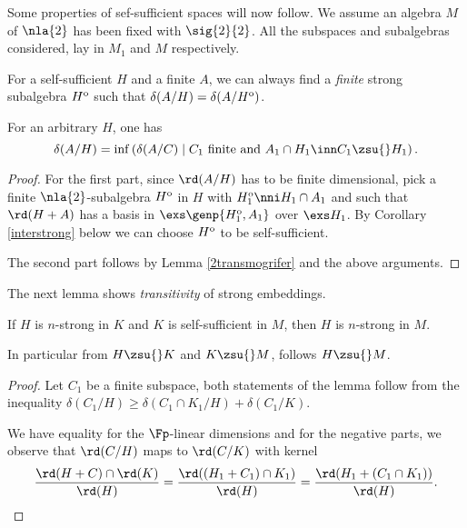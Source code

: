 \medskip
Some properties of sef-sufficient spaces will now follow. We assume an algebra $M$ of $\nla{2}$ has been fixed
with $\sig{2}{2}$. All the subspaces and subalgebras considered, lay in $M_{1}$ and $M$ respectively.

\begin{rem}\label{finitedeltabase}
For a self-sufficient $H$ and a finite $A$, we can always find a {\em finite} strong subalgebra $H^{\rm o}$
such that $\delta(A/H)=\delta(A/H^{\rm o})$.

For an arbitrary $H$, one has
$$\delta(A/H)=\inf\left(\delta(A/C)\mid C_{1}\text{ finite and }A_{1}\cap H_{1}\inn C_{1}\zsu{}H_{1}\right).$$
\end{rem}
\begin{proof}
For the first part, since $\rd(A/H)$ has to be finite dimensional, pick a finite $\nla{2}$-subalgebra
$H^{\rm o}$ in $H$ with $H^{\rm o}_{1}\nni H_{1}\cap A_{1}$ and such that $\rd(H+A)$ has a basis in $\exs\genp{H^{\rm o}_{1},A_{1}}$ over
$\exs H_{1}$. By Corollary \ref{interstrong} below we can choose $H^{\rm o}$ to be self-sufficient. 

The second part follows by Lemma \ref{2transmogrifer} and the above arguments.
\end{proof}

The next lemma shows {\em transitivity} of strong embeddings.
\begin{lem}\label{2trans}
If $H$ is $n$-strong in $K$ and $K$
is self-sufficient in $M$, then $H$ is $n$-strong in $M$.

In particular from $H\zsu{} K$ and $K\zsu{} M$, follows $H\zsu{}M$.
\end{lem}
\begin{proof}
Let $C_{1}$ be a finite subspace, both statements of the lemma follow from the
inequality $\delta(C_{1}/H)\geq\delta(C_{1}\cap K_{1}/H)+\delta(C_{1}/K)$.

We have equality for the $\Fp$-linear dimensions and for the negative parts, we observe that
$\rd(C/H)$ maps to $\rd(C/K)$ with kernel
$$\frac{\rd(H+C)\cap\rd(K)}{\rd(H)}=\frac{\rd((H_{1}+C_{1})\cap K_{1})}{\rd(H)}=\frac{\rd(H_{1}+(C_{1}\cap K_{1}))}{\rd(H)}.$$
\end{proof}



